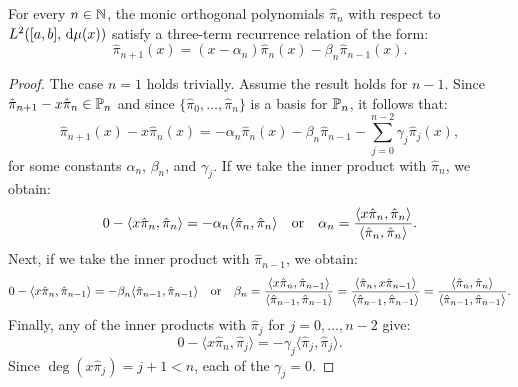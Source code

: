 \begin{theorem}\label{theorem:threetermrecurrence}
For every $n\in\N$, the monic orthogonal polynomials $\hat{\pi}_n$ with respect to $L^2([a,b],\ud\mu(x))$ satisfy a three-term recurrence relation of the form:
\begin{equation}\label{eq:threetermrecurrence}
\hat{\pi}_{n+1}(x) = (x-\alpha_n)\hat{\pi}_n(x) - \beta_n\hat{\pi}_{n-1}(x).
\end{equation}
\end{theorem}
\begin{proof}
The case $n=1$ holds trivially. Assume the result holds for $n-1$. Since $\hat{\pi}_{n+1}-x\hat{\pi}_n\in\P_n$ and since $\{\hat{\pi}_0,\ldots,\hat{\pi}_n\}$ is a basis for $\P_n$, it follows that:
\[
\hat{\pi}_{n+1}(x) - x\hat{\pi}_n(x) = -\alpha_n\hat{\pi}_n(x) - \beta_n\hat{\pi}_{n-1} - \sum_{j=0}^{n-2}\gamma_j\hat{\pi}_j(x),
\]
for some constants $\alpha_n$, $\beta_n$, and $\gamma_j$. If we take the inner product with $\hat{\pi}_n$, we obtain:
\[
0 - \langle x\hat{\pi}_n,\hat{\pi}_n\rangle = -\alpha_n\langle\hat{\pi}_n,\hat{\pi}_n\rangle \quad{\rm or}\quad \alpha_n = \dfrac{\langle x\hat{\pi}_n,\hat{\pi}_n\rangle}{\langle\hat{\pi}_n,\hat{\pi}_n\rangle}.
\]
Next, if we take the inner product with $\hat{\pi}_{n-1}$, we obtain:
\[
0 - \langle x\hat{\pi}_n,\hat{\pi}_{n-1}\rangle = -\beta_n\langle\hat{\pi}_{n-1},\hat{\pi}_{n-1}\rangle \quad{\rm or}\quad \beta_n = \dfrac{\langle x\hat{\pi}_n,\hat{\pi}_{n-1}\rangle}{\langle\hat{\pi}_{n-1},\hat{\pi}_{n-1}\rangle} = \dfrac{\langle \hat{\pi}_n,x\hat{\pi}_{n-1}\rangle}{\langle\hat{\pi}_{n-1},\hat{\pi}_{n-1}\rangle} = \dfrac{\langle \hat{\pi}_n,\hat{\pi}_n\rangle}{\langle\hat{\pi}_{n-1},\hat{\pi}_{n-1}\rangle}.
\]
Finally, any of the inner products with $\hat{\pi}_j$ for $j=0,\ldots,n-2$ give:
\[
0 - \langle x\hat{\pi}_n,\hat{\pi}_{j}\rangle = -\gamma_j\langle\hat{\pi}_{j},\hat{\pi}_{j}\rangle.
\]
Since $\deg(x\hat{\pi}_j) = j+1 < n$, each of the $\gamma_j=0$.
\end{proof}

